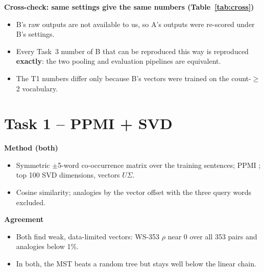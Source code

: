 \documentclass[11pt,a4paper]{article}
\newcommand{\blk}[1]{\par\needspace{5\baselineskip}\smallskip\noindent\textbf{#1}\par\nobreak\vspace{1pt}}
\begin{document}
\blk{Cross-check: same settings give the same numbers (Table~\ref{tab:cross})}
\begin{itemize}
\item B's raw outputs are not available to us, so A's outputs were re-scored under B's settings.
\item Every Task~3 number of B that can be reproduced this way is reproduced \textbf{exactly}: the two pooling and evaluation
pipelines are equivalent.
\item The T1 numbers differ only because B's vectors were trained on the count-$\ge$2 vocabulary.
\end{itemize}
\begin{table}[h]\centering\footnotesize
\caption{A's outputs re-scored in B's setting vs.\ B's reported numbers. $^a$A's vectors (min.\ count 1); $^b$B's vectors (count $\ge$2), so the
T1 rows compare two different vector sets on the same pairs.}\label{tab:cross}\end{table}

\section{Task 1 -- PPMI + SVD}\label{sec:t1}
\blk{Method (both)}
\begin{itemize}
\item Symmetric $\pm$5-word co-occurrence matrix over the training sentences; PPMI \citep{levy2014}; top 100 SVD dimensions, vectors $U\Sigma$.
\item Cosine similarity; analogies by the vector offset with the three query words excluded.
\end{itemize}
\begin{table}[h]\centering\footnotesize
\caption{Task 1 in both implementations (numbers in brackets: covered items / sentences or edges).}\label{tab:t1}\end{table}

\blk{Agreement}
\begin{itemize}
\item Both find weak, data-limited vectors: WS-353 $\rho$ near 0 over all 353 pairs and analogies below 1\%.
\item In both, the MST beats a random tree but stays well below the linear chain.
\end{itemize}
\end{document}
